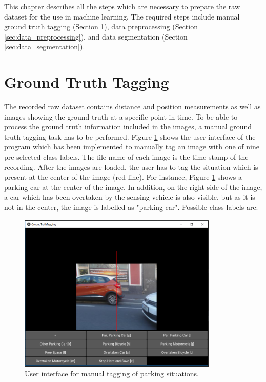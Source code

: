 This chapter describes all the steps which are necessary to prepare the raw dataset for the use in machine learning. The required steps include manual ground truth tagging (Section \ref{sec:ground_truth_tagging}), data preprocessing (Section \ref{sec:data_preprocessing}), and data segmentation (Section \ref{sec:data_segmentation}). 





\section{Ground Truth Tagging}
\label{sec:ground_truth_tagging}

The recorded raw dataset contains distance and position measurements as well as images showing the ground truth at a specific point in time. To be able to process the ground truth information included in the images, a manual ground truth tagging task has to be performed. Figure \ref{fig:ground_truth_tagging_ui} shows the user interface of the program which has been implemented to manually tag an image with one of nine pre selected class labels. The file name of each image is the time stamp of the recording. After the images are loaded, the user has to tag the situation which is present at the center of the image (red line). For instance, Figure \ref{fig:ground_truth_tagging_ui} shows a parking car at the center of the image. In addition, on the right side of the image, a car which has been overtaken by the sensing vehicle is also visible, but as it is not in the center, the image is labelled as "parking car".
Possible class labels are: 

\begin{figure}
	\centering
	\includegraphics[width=0.85\textwidth]{img/ground_truth_tagging_ui.PNG}
	\caption{User interface for manual tagging of parking situations. }
	\label{fig:ground_truth_tagging_ui}
\end{figure}

